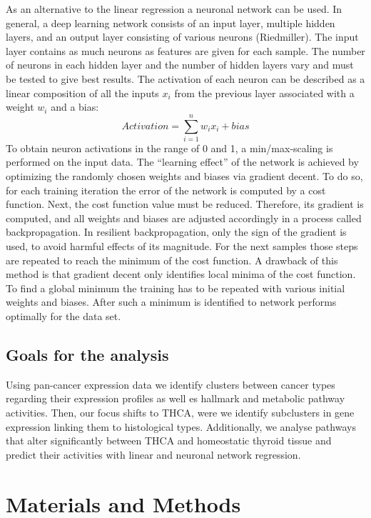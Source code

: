 \documentclass[
  parskip,
  oneside]{scrreprt}
\begin{document}
As an alternative to the linear regression a neuronal network can be
used. In general, a deep learning network consists of an input layer,
multiple hidden layers, and an output layer consisting of various
neurons (Riedmiller). The input layer contains as much neurons as
features are given for each sample. The number of neurons in each hidden
layer and the number of hidden layers vary and must be tested to give
best results. The activation of each neuron can be described as a linear
composition of all the inputs \(x_i\) from the previous layer associated
with a weight \(w_i\) and a bias:\[
Activation = \sum_{i=1} ^{n} w_i x_i + bias
\]To obtain neuron activations in the range of 0 and 1, a
min/max-scaling is performed on the input data. The ``learning effect''
of the network is achieved by optimizing the randomly chosen weights and
biases via gradient decent. To do so, for each training iteration the
error of the network is computed by a cost function. Next, the cost
function value must be reduced. Therefore, its gradient is computed, and
all weights and biases are adjusted accordingly in a process called
backpropagation. In resilient backpropagation, only the sign of the
gradient is used, to avoid harmful effects of its magnitude. For the
next samples those steps are repeated to reach the minimum of the cost
function. A drawback of this method is that gradient decent only
identifies local minima of the cost function. To find a global minimum
the training has to be repeated with various initial weights and biases.
After such a minimum is identified to network performs optimally for the
data set.

\hypertarget{goals-for-the-analysis}{%
\section{Goals for the analysis}\label{goals-for-the-analysis}}

Using pan-cancer expression data we identify clusters between cancer
types regarding their expression profiles as well es hallmark and
metabolic pathway activities. Then, our focus shifts to THCA, were we
identify subclusters in gene expression linking them to histological
types. Additionally, we analyse pathways that alter significantly
between THCA and homeostatic thyroid tissue and predict their activities
with linear and neuronal network regression.

\hypertarget{materials-and-methods}{%
\chapter{Materials and Methods}\label{materials-and-methods}}
\end{document}
